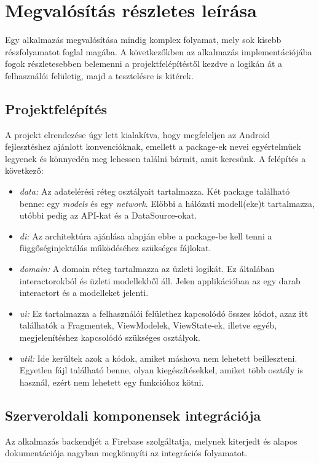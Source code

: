 \chapter{Megvalósítás részletes leírása}


Egy alkalmazás megvalósítása mindig komplex folyamat, mely sok kisebb részfolyamatot foglal magába. A következőkben az alkalmazás implementációjába fogok részletesebben belemenni a projektfelépítéstől kezdve a logikán át a felhasználói felületig, majd a tesztelésre is kitérek.

\section{Projektfelépítés}
A projekt elrendezése úgy lett kialakítva, hogy megfeleljen az Android fejlesztéshez ajánlott konvencióknak, emellett a package-ek nevei egyértelműek legyenek és könnyedén meg lehessen találni bármit, amit keresünk. A felépítés a következő:
\begin{itemize}
	\item \emph{data:} Az adatelérési réteg osztályait tartalmazza. Két package található benne: egy \emph{models} és egy \emph{network}. Előbbi a hálózati modell(eke)t tartalmazza, utóbbi pedig az API-kat és a DataSource-okat.
	\item \emph{di:} Az architektúra ajánlása alapján ebbe a package-be kell tenni a függőséginjektálás működéséhez szükséges fájlokat.
	\item \emph{domain:} A domain réteg tartalmazza az üzleti logikát. Ez általában interactorokból és üzleti modellekből áll. Jelen applikációban az egy darab interactort és a modelleket jelenti.
	\item \emph{ui:} Ez tartalmazza a felhasználói felülethez kapcsolódó összes kódot, azaz itt találhatók a Fragmentek, ViewModelek, ViewState-ek, illetve egyéb, megjelenítéshez kapcsolódó szükséges osztályok.
	\item \emph{util:} Ide kerültek azok a kódok, amiket máshova nem lehetett beilleszteni. Egyetlen fájl található benne, olyan kiegészítésekkel, amiket több osztály is használ, ezért nem lehetett egy funkcióhoz kötni.
\end{itemize}

\section{Szerveroldali komponensek integrációja}
Az alkalmazás backendjét a Firebase szolgáltatja, melynek kiterjedt és alapos dokumentációja nagyban megkönnyíti az integrációs folyamatot.

